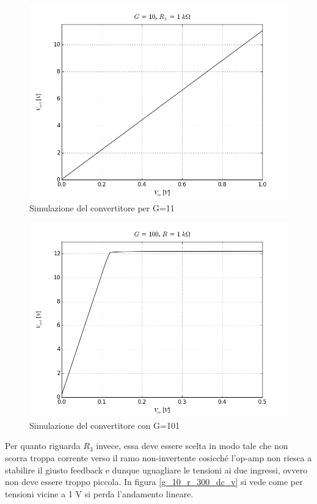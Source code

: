 \documentclass[journal, a4paper]{IEEEtran}
\begin{document}
\begin{figure}[htp]
\centering
\includegraphics[scale=.35]{g_10_r_1k_dc_v}
\caption{Simulazione del convertitore per G=11}
\label{fig:g_10_r_1k_dc_v}
\end{figure}

\begin{figure}[htp]
\centering
\includegraphics[scale=.35]{g_100_r_1k_dc_v}
\caption{Simulazione del convertitore con G=101}
\label{g_100_r_1k_dc_v}
\end{figure}

Per quanto riguarda $R_3$ invece, essa deve essere scelta in modo tale che non scorra troppa corrente verso il ramo non-invertente cosicché l'op-amp non riesca a stabilire il giusto feedback e dunque uguagliare le tensioni ai due ingressi, ovvero non deve essere troppo piccola. In figura \ref{g_10_r_300_dc_v} si vede come per tensioni vicine a 1 V si perda l'andamento lineare. 
\end{document}
